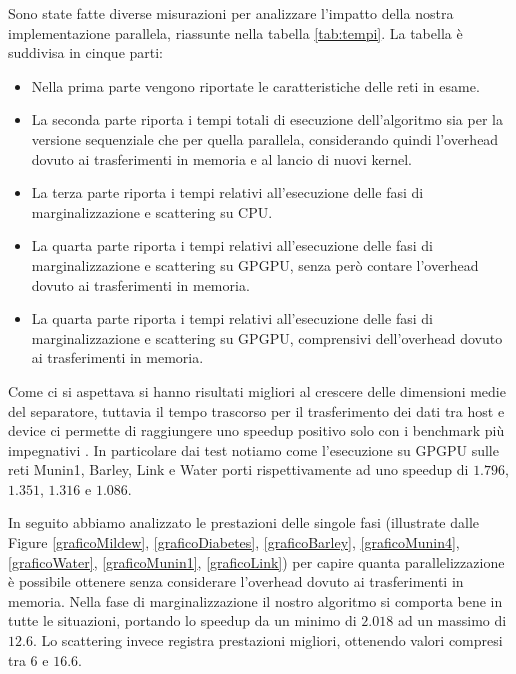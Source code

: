 \documentclass[a4paper]{article}   %
\begin{document}
Sono state fatte diverse misurazioni per analizzare l'impatto della nostra implementazione parallela, riassunte nella tabella \ref{tab:tempi}.
La tabella è suddivisa in cinque parti:
\begin{itemize}
\item Nella prima parte vengono riportate le caratteristiche delle reti in esame.
\item La seconda parte riporta i tempi totali di esecuzione dell'algoritmo sia per la versione sequenziale che per quella parallela, considerando quindi l'overhead dovuto ai trasferimenti in memoria e al lancio di nuovi kernel.
\item La terza parte riporta i tempi relativi all'esecuzione delle fasi di marginalizzazione e scattering su CPU.
\item La quarta parte riporta i tempi relativi all'esecuzione delle fasi di marginalizzazione e scattering su GPGPU, senza però contare l'overhead dovuto ai trasferimenti in memoria.
\item La quarta parte riporta i tempi relativi all'esecuzione delle fasi di marginalizzazione e scattering su GPGPU, comprensivi dell'overhead dovuto ai trasferimenti in memoria.
\end{itemize}

Come ci si aspettava si hanno risultati migliori al crescere delle dimensioni medie del separatore, tuttavia il tempo trascorso per il trasferimento dei dati tra host e device ci permette di raggiungere uno speedup positivo solo con i benchmark più impegnativi%
.  In particolare dai test notiamo come l'esecuzione su GPGPU sulle reti Munin1, Barley, Link e Water porti rispettivamente ad uno speedup di $1.796$, $1.351$, $1.316$ e $1.086$.  %


In seguito abbiamo analizzato le prestazioni delle singole fasi (illustrate dalle Figure \ref{graficoMildew}, \ref{graficoDiabetes}, \ref{graficoBarley}, \ref{graficoMunin4}, \ref{graficoWater}, \ref{graficoMunin1}, \ref{graficoLink}) per capire quanta parallelizzazione è possibile ottenere senza considerare l'overhead dovuto ai trasferimenti in memoria.
Nella fase di marginalizzazione il nostro algoritmo si comporta bene in tutte le situazioni, portando lo speedup da un minimo di $2.018$ ad un massimo di $12.6$.
Lo scattering invece registra prestazioni migliori, ottenendo valori compresi tra $6$ e $16.6$.
\end{document}
